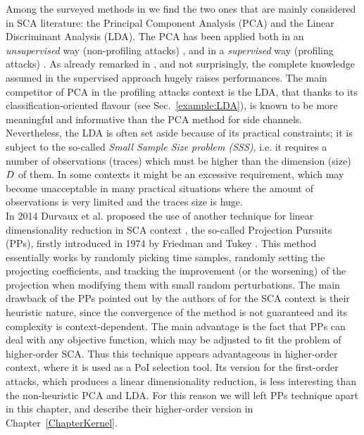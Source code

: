 Among the surveyed methods in \cite{cunningham2015linear} we find the two ones that are mainly considered in SCA literature: the Principal Component Analysis (PCA) and the Linear Discriminant Analysis (LDA). The PCA has been applied both in an {\em unsupervised} way (\ie non-profiling attacks) \cite{Batina2012,karsmakers2009side}, and in a {\em supervised} way (\ie profiling attacks) \cite{TAprincipal,choudaryefficient,choudary2014efficient,disassembler,Standaert2008}. As already remarked in \cite{disassembler}, and not surprisingly, the complete knowledge assumed in the supervised approach hugely raises performances. The main competitor of PCA in the profiling attacks context is the LDA, that thanks to its classification-oriented flavour (see Sec.~\ref{example:LDA}), is known to be more meaningful and informative \cite{lessIsMore,Standaert2008} than the PCA method  for side channels. Nevertheless, the LDA is often set aside because of its practical constraints; it is subject to the so-called {\em Small Sample Size problem (SSS)}, i.e. it requires a number of observations (traces) which must be higher than the dimension (size) $D$ of them. In some contexts it might be an excessive requirement, which may become unacceptable in many practical situations where the amount of observations is very limited and the traces size is huge.\\

In 2014 Durvaux et al. proposed the use of another technique for linear dimensionality reduction in SCA context \cite{PP}, the so-called Projection Pursuits (PPs), firstly introduced in 1974 by Friedman and Tukey \cite{friedman1974projection}. This method essentially works by randomly picking time samples, randomly setting the projecting coefficients, and tracking the improvement (or the worsening) of the projection when modifying
them with small random perturbations. The main drawback of the PPs  pointed out by the authors of \cite{PP} for the SCA context is their heuristic nature,
since the convergence of the method is not guaranteed and its complexity is
context-dependent. The main advantage is the fact that
PPs can deal with any objective function, which may be adjusted to fit the problem
of higher-order SCA. Thus this technique appears advantageous in higher-order context, where it is used as a PoI selection tool. Its version for the first-order attacks, which produces a linear dimensionality reduction, is less interesting than the non-heuristic PCA and LDA. For this reason we will left PPs technique apart in this chapter, and describe their higher-order version in Chapter~\ref{ChapterKernel}.\\

